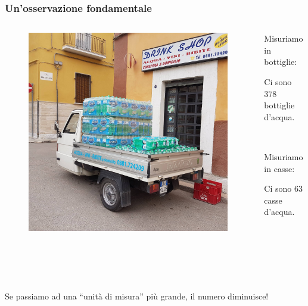 \documentclass[handout]{beamer}
\theoremstyle{plain}
\begin{document}
\begin{frame}
\frametitle{Un'osservazione fondamentale}
\begin{columns}
  \begin{column}{0.5\textwidth}
  \begin{figure}
    \includegraphics[width=\columnwidth]{img/bibite.jpg}
  \end{figure}    
  \end{column}
  \begin{column}{0.5\textwidth}
    Misuriamo in bottiglie:
    \begin{center}
      Ci sono \alert{$ 378 $} bottiglie d'acqua.\pause  
    \end{center}
    
    ~

    Misuriamo in casse:
    \begin{center}
      Ci sono \alert{$ 63 $} casse d'acqua.\pause  
    \end{center}
  \end{column}
\end{columns}

~


~

Se passiamo ad una ``unità di misura'' più grande, \alert{il numero diminuisce}!
\end{frame}
\end{document}
